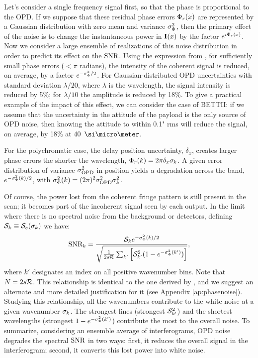 Let's consider a single frequency signal first, so that the phase is proportional to the OPD. 
If we suppose that these residual phase errors $\Phir(x)$ are represented by a Gaussian distribution with zero mean and variance $\varPhir$, then the primary effect of the noise is to change the instantaneous power in $\I(x)$ by the factor $e^{i\Phir(x)}$. Now we consider a large ensemble of realizations of this noise distribution in order to predict its effect on the $\SNR$. Using the expression from \cite{Richards:2003bp}, for sufficiently small phase errors ($<\pi$ radians), the intensity of the coherent signal is reduced, on average, by a factor $e^{-\varPhir/2}$. For Gaussian-distributed OPD uncertainties with standard deviation $\lambda/20$, where $\lambda$ is the wavelength, the signal intensity is reduced by 5\%; for $\lambda/10$ the amplitude is reduced by 18\%. To give a practical example of the impact of this effect, we can consider the case of BETTII: if we assume that the uncertainty in the attitude of the payload is the only source of OPD noise, then knowing the attitude to within 0.1" rms will reduce the signal, on average, by 18\% at 40~$\um$.

For the polychromatic case, the delay position uncertainty, $\delta_x$, creates larger phase errors the shorter the wavelength, 
$\Phir(k) = 2\pi\delta_x \s_k$. A given error distribution of variance $\varopd$ in position yields a degradation across the band, $e^{-\varPhir(k)/2}$, with $\varPhir(k) = (2\pi)^2\varopd\s_k^2$.

Of course, the power lost from the coherent fringe pattern is still present in the scan; 
it becomes part of the incoherent signal seen by each output. 
In the limit where there is no spectral noise from the background or detectors, defining $\S_k\equiv\S_e(\s_k) $ we have:
\begin{equation}
\SNR_k= \frac{\S_k e^{-\varPhir(k)/2}}{\sqrt{\frac{1}{2\samp\R}\sum_{k'} \left[\S_{k'}^2(1-e^{-\varPhir(k')})\right]}},
\label{eq:noiseph}
\end{equation}
where $k'$ designates an index on all positive wavenumber bins. Note that $N=2\samp\R$. This relationship is identical to the one derived by \citet{Meynart:1992fv}, and we suggest an alternate and more detailed justification for it (see Appendix \ref{ap:phasenoise}). Studying this relationship, all the wavenumbers contribute to the white noise at a given wavenumber $\s_k$. The strongest lines (strongest $\S^2_{k'}$) and the shortest wavelengths (strongest $1-e^{-\varPhir(k')}$) contribute the most to the overall noise.
To summarize, considering an ensemble average of interferograms, OPD noise degrades the spectral $\SNR$ in two ways: first, it reduces the overall signal in the interferogram; second, it converts this lost power into white noise.

